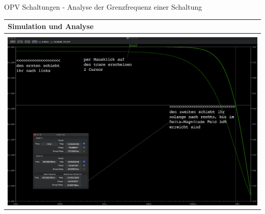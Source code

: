\begin{frame}[t]{OPV Schaltungen - Analyse der Grenzfrequenz einer Schaltung }

  \begin{spacing}{0.9} \begin{tiny}
      \begin{table}[h!]
        \begin{tabular}{p{10cm}}
          \hline
          \textbf{Simulation und Analyse} \\
          \hline                          \\
          \begin{minipage}{\textwidth}
            \includegraphics[width=\linewidth]{pictures/bode_1_remastered.png}
          \end{minipage}
          \\
        \end{tabular}

      \end{table}

    \end{tiny} \end{spacing}



\end{frame}


